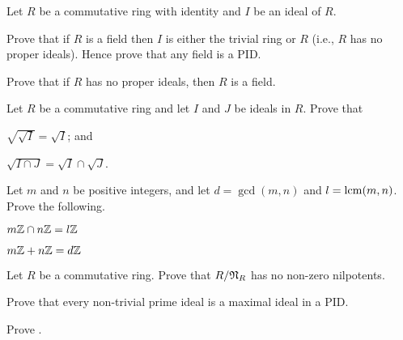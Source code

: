 \begin{problem}\label{problem-ring-is-field-iff-no-proper-ideals}
    Let $R$ be a commutative ring with identity and $I$ be an ideal of $R$.
    \begin{partquestions}{\alph*}
        \item Prove that if $R$ is a field then $I$ is either the trivial ring or $R$ (i.e., $R$ has no proper ideals). Hence prove that any field is a PID.
        \item Prove that if $R$ has no proper ideals, then $R$ is a field.
    \end{partquestions}
\end{problem}

\begin{problem}
    Let $R$ be a commutative ring and let $I$ and $J$ be ideals in $R$. Prove that
    \begin{partquestions}{\alph*}
        \item $\sqrt{\sqrt{I}} = \sqrt{I}$; and
        \item $\sqrt{I \cap J} = \sqrt{I} \cap \sqrt{J}$.
    \end{partquestions}
\end{problem}

\begin{problem}
    Let $m$ and $n$ be positive integers, and let $d = \gcd(m,n)$ and $l = \mathrm{lcm}(m,n)$. Prove the following.
    \begin{partquestions}{\alph*}
        \item $m\mathbb{Z} \cap n\mathbb{Z} = l\mathbb{Z}$
        \item $m\mathbb{Z} + n\mathbb{Z} = d\mathbb{Z}$
    \end{partquestions}
\end{problem}

\begin{problem}
    Let $R$ be a commutative ring. Prove that $R / \mathfrak{N}_{R}$ has no non-zero nilpotents.
\end{problem}

\begin{problem}\label{problem-non-trivial-prime-ideal-is-maximal-in-PID}
    Prove that every non-trivial prime ideal is a maximal ideal in a PID.
\end{problem}

\begin{problem}\label{problem-principal-ideals-equal-iff-associates}
    Prove .
\end{problem}
